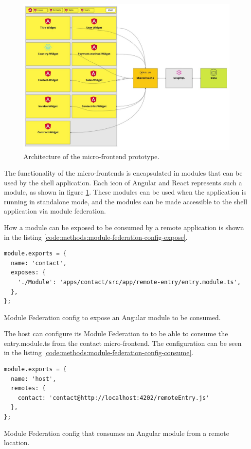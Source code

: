 \ifshowImages
\begin{figure}[H]
\centering
\includegraphics[width=0.8\linewidth]{images/ui-dashboard-architecture.jpeg}
\caption{Architecture of the micro-frontend prototype.}\label{figure:methods:ui-dashboard-architecture}
\end{figure}
\fi

The functionality of the micro-frontends is encapsulated in modules that can be used by the shell application. Each icon of Angular and React represents such a module, as shown in figure \ref{figure:methods:ui-dashboard-architecture}. These modules can be used when the application is running in standalone mode, and the modules can be made accessible to the shell application via module federation.

How a module can be exposed to be consumed by a remote application is shown in the listing \ref{code:methods:module-federation-config-expose}.

\ifshowListings
\begin{listing}[H]
\begin{verbatim}
module.exports = {
  name: 'contact',
  exposes: {
    './Module': 'apps/contact/src/app/remote-entry/entry.module.ts',
  },
};
\end{verbatim}
\caption{Module Federation config to expose an Angular module to be consumed.}\label{code:methods:module-federation-config-expose}
\end{listing}
\fi

The host can configure its Module Federation to to be able to consume the entry.module.ts from the contact micro-frontend. The configuration can be seen in the listing \ref{code:methods:module-federation-config-consume}.

\ifshowListings
\begin{listing}[H]
\begin{verbatim}
module.exports = {
  name: 'host',
  remotes: {
    contact: 'contact@http://localhost:4202/remoteEntry.js'
  },
};
\end{verbatim}
\caption{Module Federation config that consumes an Angular module from a remote location.}\label{code:methods:module-federation-config-consume}
\end{listing}
\fi

